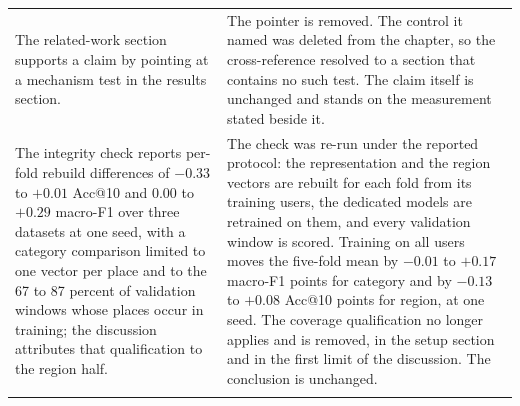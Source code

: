 \begin{table}[htb]
\begin{tabular}{@{}p{}p{}@{}}
The related-work section supports a claim by pointing at a
mechanism test in the results section. &
The pointer is removed. The control it named was deleted from
the chapter, so the cross-reference resolved to a section that
contains no such test. The claim itself is unchanged and stands
on the measurement stated beside it. \\
\addlinespace
The integrity check reports per-fold rebuild differences of
$-0.33$ to $+0.01$ Acc@10 and $0.00$ to $+0.29$ macro-F1 over
three datasets at one seed, with a category comparison limited
to one vector per place and to the 67 to 87 percent of
validation windows whose places occur in training; the
discussion attributes that qualification to the region half. &
The check was re-run under the reported protocol: the
representation and the region vectors are rebuilt for each fold
from its training users, the dedicated models are retrained on
them, and every validation window is scored. Training on all
users moves the five-fold mean by $-0.01$ to $+0.17$ macro-F1
points for category and by $-0.13$ to $+0.08$ Acc@10 points for
region, at one seed. The coverage qualification no longer applies and is
removed, in the setup section and in the first limit of the
discussion. The conclusion is unchanged. \\
\addlinespace
%

\end{tabular}
\end{table}
